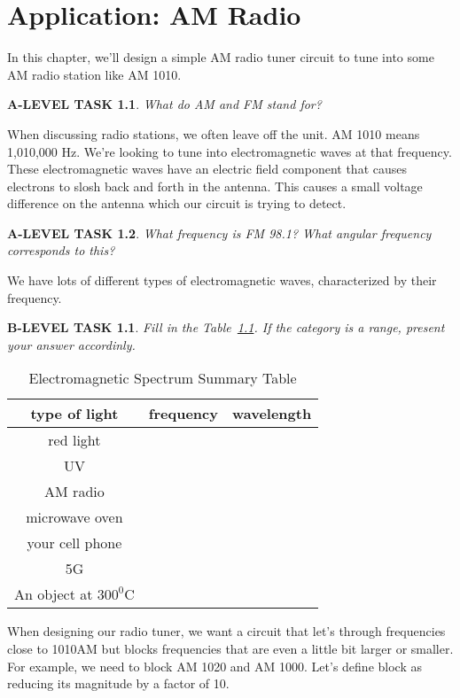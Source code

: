 \documentclass{book}
\numberwithin{equation}{section}
\newtheorem{alevel}{A-LEVEL TASK}
\newtheorem{blevel}{B-LEVEL TASK}
\theoremstyle{definition}
\begin{document}
\chapter{Application: AM Radio}
In this chapter, we'll design a simple AM radio tuner circuit to tune into some AM radio station like AM 1010.

\begin{alevel}
What do AM and FM stand for?
\end{alevel}

When discussing radio stations, we often leave off the unit. AM 1010 means 1,010,000 Hz. We're looking to tune into electromagnetic waves at that frequency. These electromagnetic waves have an electric field component that causes electrons to slosh back and forth in the antenna. This causes a small voltage difference on the antenna which our circuit is trying to detect.

\begin{alevel}
What frequency is FM 98.1? What angular frequency corresponds to this?
\end{alevel}

We have lots of different types of electromagnetic waves, characterized by their frequency. 

\begin{blevel}
Fill in the Table~\ref{T:9L}. If the category is a range, present your answer accordinly.
\end{blevel}

\begin{table}[H]
\begin{center}
\begin{tabular}{c|c|c}
type of light&frequency&wavelength\\ \hline
red light&& \\ \hline
UV&& \\ \hline
AM radio&& \\ \hline
microwave oven&& \\ \hline
your cell phone&& \\ \hline
5G&& \\ \hline
An object at $300^0$C&& \\ \hline
\end{tabular}
\caption{Electromagnetic Spectrum Summary Table}
\label{T:9L}
\end{center}
\end{table}

When designing our radio tuner, we want a circuit that let's through frequencies close to 1010AM but blocks frequencies that are even a little bit larger or smaller. For example, we need to block AM 1020 and AM 1000. Let's define block as reducing its magnitude by a factor of 10.\par
\end{document}

